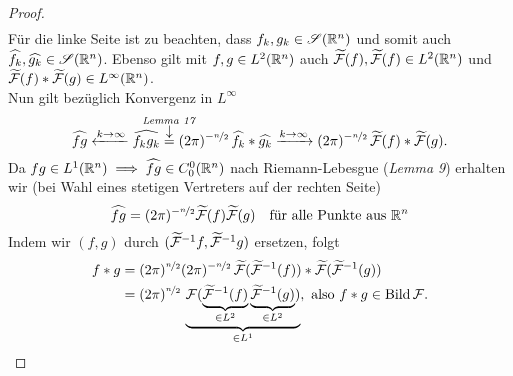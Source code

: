\documentclass[skript.tex]{subfiles}
\begin{document}
\begin{proof}
\begin{align*}
		\end{align*}
		Für die linke Seite ist zu beachten, dass $f_k,g_k \in \mathscr{S}(\mathbb{R}^n)$ und somit auch $\widehat{f_k},\widehat{g_k} \in \mathscr{S}(\mathbb{R}^n)$. %
		Ebenso gilt mit $f,g \in L^2(\mathbb{R}^n)$ auch $\widetilde{\mathcal{F}}(f),\widetilde{\mathcal{F}}(f)\in L^2(\mathbb{R}^n)$ und $\widetilde{\mathcal{F}}(f) \ast \widetilde{\mathcal{F}}(g) \in L^\infty(\mathbb{R}^n)$.\\
		Nun gilt bezüglich Konvergenz in $L^\infty$
		\[
			\wh{fg} \xleftarrow{k\to\infty} \wh{f_k g_k} \darrow{\text{\emph{Lemma 17}}}{=} (2\pi)^{-\nicefrac{n}{2}} \, \wh{f_k}\ast\wh{g_k} \xrightarrow{k\to\infty} (2\pi)^{-\nicefrac{n}{2}} \,\wt{\F}(f)\ast\wt{\F}(g).
		\]
		Da $fg \in L^1(\mathbb{R}^n) \implies \widehat{fg} \in C_0^0(\mathbb{R}^n)$ nach Riemann-Lebesgue (\emph{Lemma 9}) erhalten wir (bei Wahl eines stetigen Vertreters auf der rechten Seite)
		\[
			\widehat{fg} = (2\pi)^{-\nicefrac{n}{2}} \widetilde{\mathcal{F}}(f)\widetilde{\mathcal{F}}(g) \quad\text{für alle Punkte aus $\mathbb{R}^n$}
		\]
		Indem wir $(f,g)$ durch $(\widetilde{\mathcal{F}}^{-1}f,\widetilde{\mathcal{F}}^{-1}g)$ ersetzen, folgt
		\begin{align*}
			f \ast g &= (2\pi)^{\nicefrac{n}{2}}(2\pi)^{-\nicefrac{n}{2}} \,\widetilde{\mathcal{F}}(\widetilde{\mathcal{F}}^{-1}(f)) \ast \widetilde{\mathcal{F}}(\widetilde{\mathcal{F}}^{-1}(g)) \\
			&= (2\pi)^{\nicefrac{n}{2}}\,\underbrace{\mathcal{F}(\underbrace{\widetilde{\mathcal{F}}^{-1}(f)}_{\in L^2}\underbrace{\widetilde{\mathcal{F}}^{-1}(g)}_{\in L^2})}_{\in L^1}, \text{ also } f \ast g \in \operatorname{Bild} \mathcal{F}.
		\end{align*}
	\end{proof}
\end{document}
